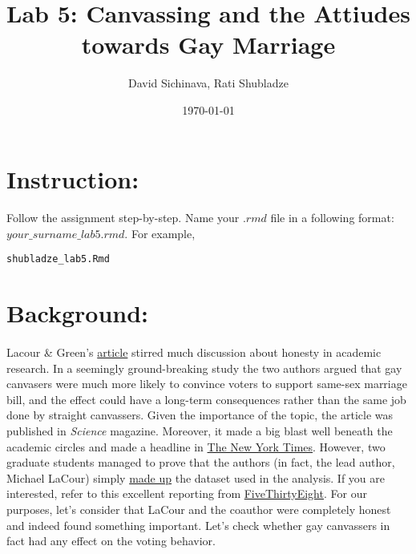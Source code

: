 \documentclass{article}\usepackage[]{graphicx}\usepackage[]{color}
\title{Lab 5: Canvassing and the Attiudes towards Gay Marriage}
\author{David Sichinava, Rati Shubladze}
\date{\today}
\makeatletter
\newcommand{\hlstd}[1]{\textcolor[rgb]{0.345,0.345,0.345}{#1}}%
\newenvironment{kframe}{%
 \def\at@end@of@kframe{}%
 \ifinner\ifhmode%
  \def\at@end@of@kframe{\end{minipage}}%
  \begin{minipage}{\columnwidth}%
 \fi\fi%
 \def\FrameCommand##1{\hskip\@totalleftmargin \hskip-\fboxsep
 \colorbox{shadecolor}{##1}\hskip-\fboxsep
     \hskip-\linewidth \hskip-\@totalleftmargin \hskip\columnwidth}%
 \MakeFramed {\advance\hsize-\width
   \@totalleftmargin\z@ \linewidth\hsize
   \@setminipage}}%
 {\par\unskip\endMakeFramed%
 \at@end@of@kframe}
\newenvironment{knitrout}{}{} %
\makeatother
\begin{document}
\maketitle

\section*{Instruction:}

\paragraph{}
Follow the assignment step-by-step. Name your $.rmd$ file in a following format: $your\_surname\_lab5.rmd$. For example,

\begin{knitrout}
\color{fgcolor}\begin{kframe}
\begin{alltt}
\hlstd{shubladze_lab5.Rmd}
\end{alltt}
\end{kframe}
\end{knitrout}

\section*{Background:}
\paragraph{}
Lacour \& Green's \href{https://www.dropbox.com/s/aseyh1yl142o2ut/lacour2014.pdf?dl=0}{article} stirred much discussion about honesty in academic research. In a seemingly ground-breaking study the two authors argued that gay canvasers were much more likely to convince voters to support same-sex marriage bill, and the effect could have a long-term consequences rather than the same job done by straight canvassers. Given the importance of the topic, the article was published in \emph{Science} magazine. Moreover, it made a big blast well beneath the academic circles and made a headline in \href{https://www.nytimes.com/2014/12/12/health/gay-marriage-canvassing-study-science.html?_r=0}{The New York Times}. However, two graduate students managed to prove that the authors (in fact, the lead author, Michael LaCour) simply \href{http://web.stanford.edu/~dbroock/broockman_kalla_aronow_lg_irregularities.pdf}{made up} the dataset used in the analysis. 
If you are interested, refer to this excellent reporting from \href{https://fivethirtyeight.com/features/how-two-grad-students-uncovered-michael-lacour-fraud-and-a-way-to-change-opinions-on-transgender-rights/}{FiveThirtyEight}. For our purposes, let's consider that LaCour and the coauthor were completely honest and indeed found something important. Let's check whether gay canvassers in fact had any effect on the voting behavior.
\end{document}
